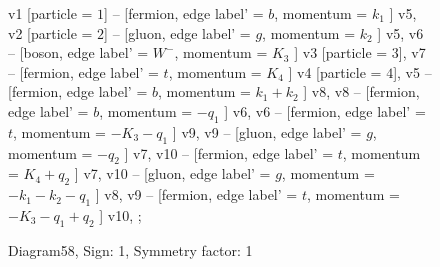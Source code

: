 \documentclass{revtex4}
\begin{document}
\begin{figure}[!htb]
\begin{center}
{    %
v1 [particle = \(1\)] -- [fermion, edge label' = \(b\), momentum = \(k_{1}\) ] v5, 
v2 [particle = \(2\)] -- [gluon, edge label' = \(g\), momentum = \(k_{2}\) ] v5, 
v6 -- [boson, edge label' = \(W^{-}\), momentum = \(K_{3}\) ] v3 [particle = \(3\)], 
v7 -- [fermion, edge label' = \(t\), momentum = \(K_{4}\) ] v4 [particle = \(4\)], 
v5 -- [fermion, edge label' = \(b\), momentum = \(k_{1} + k_{2}\) ] v8, 
v8 -- [fermion, edge label' = \(b\), momentum = \(-q_{1}\) ] v6, 
v6 -- [fermion, edge label' = \(t\), momentum = \(-K_{3} - q_{1}\) ] v9, 
v9 -- [gluon, edge label' = \(g\), momentum = \(-q_{2}\) ] v7, 
v10 -- [fermion, edge label' = \(t\), momentum = \(K_{4} + q_{2}\) ] v7, 
v10 -- [gluon, edge label' = \(g\), momentum = \(-k_{1} - k_{2} - q_{1}\) ] v8, 
v9 -- [fermion, edge label' = \(t\), momentum = \(-K_{3} - q_{1} + q_{2}\) ] v10, 
};
\end{center}
\caption{Diagram58, Sign: 1, Symmetry factor: 1}
\end{figure}
\newpage
\end{document}
